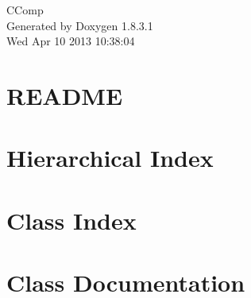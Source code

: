 \documentclass{book}
\begin{document}
\hypersetup{pageanchor=false,citecolor=blue}
\begin{titlepage}
\vspace*{7cm}
\begin{center}
{\Large C\-Comp }\\
\vspace*{1cm}
{\large Generated by Doxygen 1.8.3.1}\\
\vspace*{0.5cm}
{\small Wed Apr 10 2013 10:38:04}\\
\end{center}
\end{titlepage}
\clearemptydoublepage
{}
\tableofcontents
\clearemptydoublepage
{}
\hypersetup{pageanchor=true,citecolor=blue}
\chapter{R\-E\-A\-D\-M\-E}
\label{md_README}
\hypertarget{md_README}{}

\chapter{Hierarchical Index}

\chapter{Class Index}

\chapter{Class Documentation}






























































\printindex
\end{document}
